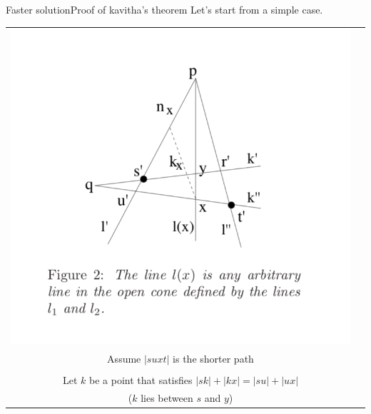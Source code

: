\documentclass{beamer}
\begin{document}
\begin{frame}{Faster solution}{Proof of kavitha's theorem}
    Let's start from a simple case. \\
    \begin{tabular}{c c}
        \begin{minipage}{0.4\textwidth}
            \includegraphics[width=\linewidth]{simple_proof.png}
        \end{minipage}  
        &  
        \begin{minipage}{0.5\textwidth}
            Path $s-y-x-t$, $s-u-x-t$ \\
            Assume $|suxt|$ is the shorter path \\
            \\
            Let $k$ be a point that satisfies $|sk| + |kx| = |su| + |ux|$ \\
            ($k$ lies between $s$ and $y$)
        \end{minipage} 
    \end{tabular}
\end{frame}
\end{document}
